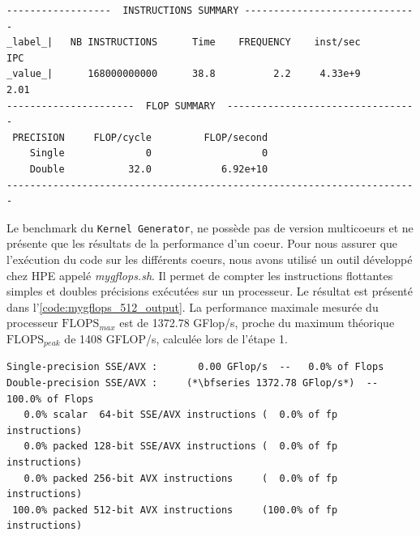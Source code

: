         
\begin{lstlisting}[caption=Résultat de l'exécution du benchmark sur un coeur avec le turbo activé, label={code:kg_512_output},
  basicstyle=\footnotesize, frame=tb,
  xleftmargin=.005\textwidth, xrightmargin=.005\textwidth]
------------------  INSTRUCTIONS SUMMARY ------------------------------
_label_|   NB INSTRUCTIONS      Time    FREQUENCY    inst/sec       IPC
_value_|      168000000000      38.8          2.2     4.33e+9      2.01
----------------------  FLOP SUMMARY  ---------------------------------
 PRECISION     FLOP/cycle         FLOP/second
    Single              0                   0
    Double           32.0            6.92e+10
-----------------------------------------------------------------------
\end{lstlisting}
        
        Le benchmark du \verb=Kernel Generator=, ne possède pas de version multicoeurs et ne présente que les résultats de la performance d'un coeur. Pour nous assurer que l'exécution du code sur les différents coeurs, nous avons utilisé un outil développé chez HPE appelé \textit{mygflops.sh}. Il permet de compter les instructions flottantes simples et doubles précisions exécutées sur un processeur. Le résultat est présenté dans l'\autoref{code:mygflops_512_output}. La performance maximale mesurée du processeur $\text{FLOPS}_{max}$ est de 1372.78 GFlop/s, proche du maximum théorique $\text{FLOPS}_{peak}$ de 1408 GFLOP/s, calculée lors de l'étape 1.
        
\begin{lstlisting}[caption=Résultat de l'outil \textit{myflops.sh} utilisé pour compter les instructions flottante exécutées sur un processeur., label={code:mygflops_512_output},
  basicstyle=\footnotesize, frame=tb,
  xleftmargin=.005\textwidth, xrightmargin=.005\textwidth]
Single-precision SSE/AVX :       0.00 GFlop/s  --   0.0% of Flops
Double-precision SSE/AVX :     (*\bfseries 1372.78 GFlop/s*)  -- 100.0% of Flops
   0.0% scalar  64-bit SSE/AVX instructions (  0.0% of fp instructions)
   0.0% packed 128-bit SSE/AVX instructions (  0.0% of fp instructions)
   0.0% packed 256-bit AVX instructions     (  0.0% of fp instructions)
 100.0% packed 512-bit AVX instructions     (100.0% of fp instructions)
\end{lstlisting}
